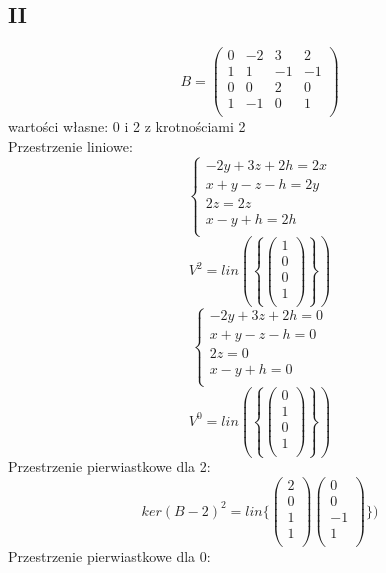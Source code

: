 \documentclass{article}
\begin{document}
\subsection*{II}
$$
B=
\begin{pmatrix}
0 & -2 & 3 & 2\\
1 & 1 & -1 & -1\\
0 & 0 & 2 & 0\\
1 & -1 & 0 & 1\\
\end{pmatrix}
$$
wartości własne: 0 i 2 z krotnościami 2
\\Przestrzenie liniowe:
$$
\begin{cases}
-2y + 3z + 2h = 2x\\
x + y - z - h = 2y\\
2z = 2z\\
x - y + h = 2h\\
\end{cases}
$$
$$
V^2 = lin(\left \{\begin{pmatrix}
 1\\
 0\\
0\\
1\\
\end{pmatrix}\right\})
$$
$$
\begin{cases}
-2y + 3z + 2h = 0\\
x + y - z - h = 0\\
2z = 0\\
x - y + h = 0\\
\end{cases}
$$
$$
V^0 = lin(\left \{\begin{pmatrix}
 0\\
 1\\
0\\
1\\
\end{pmatrix}
\right\})
$$
Przestrzenie pierwiastkowe dla 2:
$$
ker(B-2)^2 = lin \{\begin{pmatrix}
 2\\
 0\\
 1\\
 1\\
\end{pmatrix}
\begin{pmatrix}
 0\\
 0\\
 -1\\
 1\\
\end{pmatrix}\})
$$
Przestrzenie pierwiastkowe dla 0:
\end{document}

